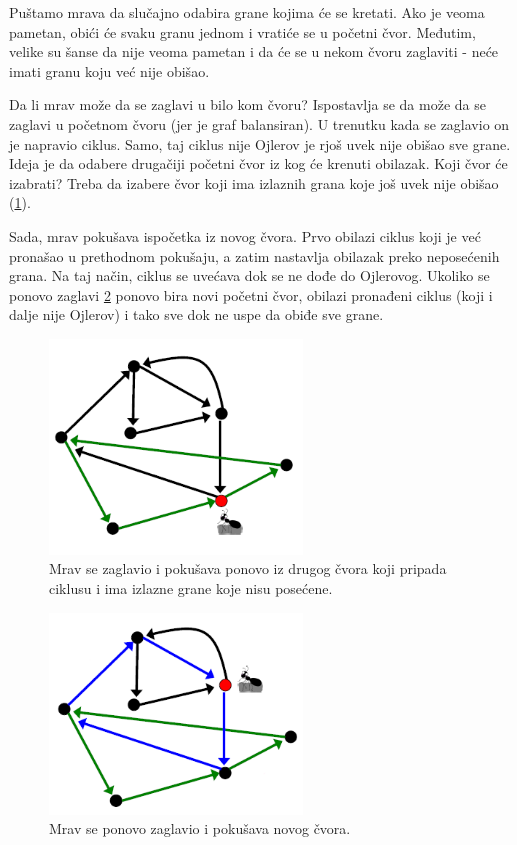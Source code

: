 Puštamo mrava da slučajno odabira grane kojima će se kretati. Ako je veoma pametan, obići će svaku granu jednom i vratiće se u početni čvor. Međutim, velike su šanse da nije veoma pametan i da će se u nekom čvoru zaglaviti - neće imati granu koju već nije obišao.

Da li mrav može da se zaglavi u bilo kom čvoru? Ispostavlja se da može da se zaglavi u početnom čvoru (jer je graf balansiran). U trenutku kada se zaglavio on je napravio ciklus. Samo, taj ciklus nije Ojlerov je rjoš uvek nije obišao sve grane. Ideja je da odabere drugačiji početni čvor iz kog će krenuti obilazak. Koji čvor će izabrati? Treba da izabere čvor koji ima izlaznih grana koje još uvek nije obišao (\ref{slika:mrav2}). 

Sada, mrav pokušava ispočetka iz novog čvora. Prvo obilazi ciklus koji je već pronašao u prethodnom pokušaju, a zatim nastavlja obilazak preko neposećenih grana. Na taj način, ciklus se uvećava dok se ne dođe do Ojlerovog. Ukoliko se ponovo zaglavi \ref{slika:mrav3} ponovo bira novi početni čvor, obilazi pronađeni ciklus (koji i dalje nije Ojlerov) i tako sve dok ne uspe da obiđe sve grane.


\begin{figure}[H]
	\centering
	\includegraphics[width=0.6\textwidth]{poglavlja/3/slike/mrav2.png}
	\caption{Mrav se zaglavio i pokušava ponovo iz drugog čvora koji pripada ciklusu i ima izlazne grane koje nisu posećene.}
	\label{slika:mrav2}
\end{figure} 


\begin{figure}[H]
	\centering
	\includegraphics[width=0.6\textwidth]{poglavlja/3/slike/mrav3.png}
	\caption{Mrav se ponovo zaglavio i pokušava novog čvora.}
	\label{slika:mrav3}
\end{figure} 


